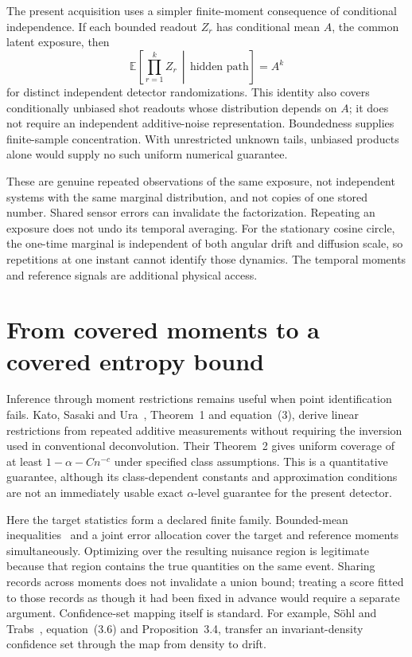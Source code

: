 The present acquisition uses a simpler finite-moment consequence of
conditional independence. If each bounded readout $Z_r$ has conditional mean
$A$, the common latent exposure, then
\begin{equation}
 \mathbb E\!\left[\prod_{r=1}^{k}Z_r\,\middle|\,\text{hidden path}\right]
 =A^k
 \label{eq:dc-literature-replica}
\end{equation}
for distinct independent detector randomizations. This identity also covers
conditionally unbiased shot readouts whose distribution depends on $A$;
it does not require an independent additive-noise representation. Boundedness
supplies finite-sample concentration. With unrestricted unknown tails,
unbiased products alone would supply no such uniform numerical guarantee.

These are genuine repeated observations of the same exposure, not independent
systems with the same marginal distribution, and not copies of one stored
number. Shared sensor errors can invalidate the factorization. Repeating an
exposure does not undo its temporal averaging. For the stationary cosine
circle, the one-time marginal is independent of both angular drift and
diffusion scale, so repetitions at one instant cannot identify those dynamics.
The temporal moments and reference signals are additional physical access.

\section{From covered moments to a covered entropy bound}

Inference through moment restrictions remains useful when point identification
fails. Kato, Sasaki and Ura~\cite{dcKato2021}, Theorem~1 and equation~(3),
derive linear restrictions from repeated additive measurements without
requiring the inversion used in conventional deconvolution. Their Theorem~2
gives uniform coverage of at least $1-\alpha-Cn^{-c}$ under specified class
assumptions. This is a quantitative guarantee, although its class-dependent
constants and approximation conditions are not an immediately usable exact
$\alpha$-level guarantee for the present detector.

Here the target statistics form a declared finite family. Bounded-mean
inequalities~\cite{caHoeffding1963,ogMaurer2009} and a joint error allocation
cover the target and reference moments simultaneously. Optimizing over the
resulting nuisance region is legitimate because that region contains the
true quantities on the same event. Sharing records across moments does not
invalidate a union bound; treating a score fitted to those records as though
it had been fixed in advance would require a separate argument. Confidence-set
mapping itself is standard. For example, S\"ohl and Trabs~\cite{dcSohl2016},
equation~(3.6) and Proposition~3.4, transfer an invariant-density confidence
set through the map from density to drift.

